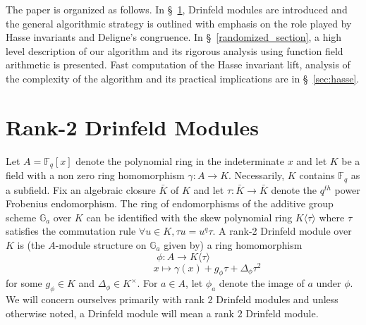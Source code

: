\documentclass[12pt]{article}
\theoremstyle{plain}
\theoremstyle{definition}
\def\F{\ensuremath{\mathbb{F}}}
\begin{document}
The paper is organized as follows. In \S~\ref{drinfeld_section}, Drinfeld modules are introduced 
and the general algorithmic strategy is outlined with emphasis on the role played by Hasse 
invariants and Deligne's congruence. In \S~\ref{randomized_section}, a high level description of 
our algorithm and its rigorous analysis using function field arithmetic is presented. Fast 
computation of the Hasse invariant lift, analysis of the complexity of the algorithm and its 
practical implications are in \S~\ref{sec:hasse}. 
 
 

\section{Rank-2 Drinfeld Modules}\label{drinfeld_section}
 Let $A=\F_q[x]$ denote the polynomial ring in the indeterminate $x$ and let $K$ be a field with a 
 non zero ring homomorphism $\gamma:A \rightarrow K$. Necessarily, $K$ contains $\F_q$ as a 
 subfield. Fix an algebraic closure $\bar{K}$ of $K$ and let $\tau: \bar{K} \longrightarrow 
 \bar{K}$ denote the $q^{th}$ power Frobenius endomorphism. The ring of endomorphisms of the 
 additive group scheme $\mathbb{G}_a$ over $K$ can be identified with the skew polynomial ring 
 $K\langle \tau \rangle$ where $\tau$ satisfies the commutation rule $\forall u \in K, \tau u = u^q 
 \tau$.
A rank-2 Drinfeld module over $K$ is (the $A$-module structure on $\mathbb{G}_a$ given by) a ring homomorphism
$$\phi : A \longrightarrow K\langle \tau \rangle$$ 
$$\ \ \ \ \ \ \ \ \ \ \ \ \ \ \ \ \ \ \ \ \ \ x \longmapsto \gamma(x) + g_\phi \tau + \Delta_\phi \tau^2$$
for some $g_\phi \in K$ and $\Delta_\phi \in K^\times$. For $a \in A$, let $\phi_a$ denote the image of $a$ under $\phi$. We will concern ourselves primarily with rank $2$ Drinfeld modules and unless otherwise noted, a Drinfeld module will mean a rank $2$ Drinfeld module.\\ \\
\end{document}
